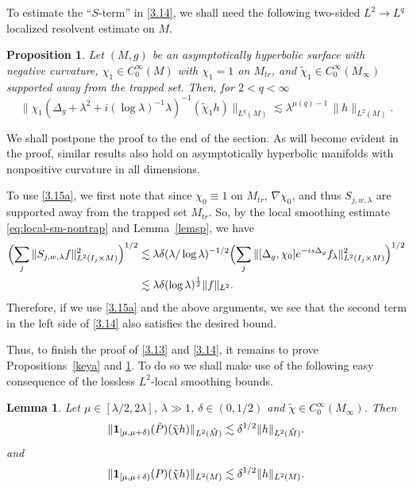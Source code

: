 \documentclass[10pt]{amsart}
\newtheorem{lemma}[theorem]{Lemma}
\newtheorem{proposition}[theorem]{Proposition}
\newcommand{\la}{\lambda}
\newcommand{\one}{{\bf 1}}
\newcommand{\1}{{\bf 1}}
\begin{document}
To estimate the ``$S$-term'' in \eqref{3.14}, we
 shall need the following two-sided $L^2\to L^q$ localized resolvent estimate on $M$.


\begin{proposition}\label{keyb}
Let $(M,g)$ be an asymptotically hyperbolic surface with negative curvature,
 $ \chi_1\in C^\infty_0(M)$ with $\chi_1=1$ on $M_{tr}$, and $ \tilde\chi_1\in C^\infty_0(M_\infty)$  supported away from the trapped set.
Then, for 
$2<q<\infty$
\begin{equation}\label{3.15a}
\| \chi_1(\Delta_{ g}+\la^2+i (\log\la)^{-1} \la)^{-1} ( \tilde \chi_1 h)\|_{L^q( M)} \lesssim \la^{\mu(q)-1}  \, 
\|h\|_{L^2(M)}.
\end{equation}
\end{proposition}
We shall postpone the proof to the end of the section. As will become evident in the proof, similar results also hold on asymptotically hyperbolic manifolds with nonpositive curvature in all dimensions.



To use \eqref{3.15a}, we first note that
since $\chi_0\equiv 1$ on $M_{tr}$, $\nabla \chi_0$, and thus $S_{j,w,\la}$ are supported away from the trapped set $M_{tr}$. So, by the local smoothing estimate \eqref{eq:local-sm-nontrap} and Lemma~\ref{lemsp}, we have
\begin{equation}
    \begin{aligned}
\Bigl(\sum_j \|S_{j,w,\la}f\|^2_{L^2(I_j\times M)}\Bigr)^{1/2}&\lesssim \la\delta(\la/\log\la)^{-1/2}\Bigl(\sum_j \|[\Delta_g,\chi_0]e^{-is\Delta_g}f_\la\|^2_{L^2(I_j\times M)}\Bigr)^{1/2}
\\ &\lesssim \la\delta(\log\la)^{\frac12}\|f\|_{L^2}.        
    \end{aligned}
\end{equation}
Therefore, if we use \eqref{3.15a} and the above arguments, we see that the second term in the left side of \eqref{3.14} also
satisfies the desired bound.


Thus, to finish the proof of  \eqref{3.13} and \eqref{3.14}, it remains to prove Propositions~\ref{keya} and \ref{keyb}.  To do so we shall make use of the following easy consequence of the lossless $L^2$-local smoothing bounds.


\begin{lemma}\label{loc}  {Let} $\mu\in [\la/2,2\la]$, $\la\gg 1$, $\delta\in (0,1/2)$ and $\tilde \chi\in C^\infty_0(M_\infty)$. {Then}
\begin{equation}\label{3.17}
\| \one_{[\mu,\mu+\delta)}(\tilde P) (\tilde \chi h)\|_{L^2(\tilde M)}\lesssim \delta^{1/2}\|h\|_{L^2(\tilde M)}.
\end{equation}
and
\begin{equation}\label{3.19}
\| \one_{[\mu,\mu+\delta)}(P) (\tilde \chi h)\|_{L^2( M)}\lesssim \delta^{1/2}\|h\|_{L^2( M)}.
\end{equation}
\end{lemma}
\end{document}
